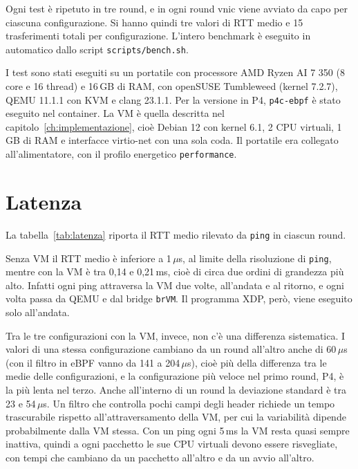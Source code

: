Ogni test è ripetuto in tre round, e in ogni round vnic viene avviato da capo per ciascuna configurazione. Si hanno quindi tre valori di RTT medio e 15 trasferimenti totali per configurazione. L'intero benchmark è eseguito in automatico dallo script \texttt{scripts/bench.sh}.

I test sono stati eseguiti su un portatile con processore AMD Ryzen AI 7 350 (8 core e 16 thread) e 16\,GB di RAM, con openSUSE Tumbleweed (kernel 7.2.7), QEMU 11.1.1 con KVM e clang 23.1.1. Per la versione in P4, \texttt{p4c-ebpf} è stato eseguito nel container.
La VM è quella descritta nel capitolo~\ref{ch:implementazione}, cioè Debian 12 con kernel 6.1, 2 CPU virtuali, 1\,GB di RAM e interfacce virtio-net con una sola coda. Il portatile era collegato all'alimentatore, con il profilo energetico \texttt{performance}.

\section{Latenza}\label{sec:latenza}

La tabella~\ref{tab:latenza} riporta il RTT medio rilevato da \texttt{ping} in ciascun round.

\begin{table}[H]
    \centering
    
    \caption{RTT medio da \texttt{ns0} a \texttt{ns1} in $\mu$s (1000 ping per round)}
    \label{tab:latenza}
\end{table}

Senza VM il RTT medio è inferiore a 1\,$\mu$s, al limite della risoluzione di \texttt{ping}, mentre con la VM è tra 0,14 e 0,21\,ms, cioè di circa due ordini di grandezza più alto. Infatti ogni ping attraversa la VM due volte, all'andata e al ritorno, e ogni volta passa da QEMU e dal bridge \texttt{brVM}. Il programma XDP, però, viene eseguito solo all'andata.

Tra le tre configurazioni con la VM, invece, non c'è una differenza sistematica. I valori di una stessa configurazione cambiano da un round all'altro anche di 60\,$\mu$s (con il filtro in eBPF vanno da 141 a 204\,$\mu$s), cioè più della differenza tra le medie delle configurazioni, e la configurazione più veloce nel primo round, P4, è la più lenta nel terzo. Anche all'interno di un round la deviazione standard è tra 23 e 54\,$\mu$s. Un filtro che controlla pochi campi degli header richiede un tempo trascurabile rispetto all'attraversamento della VM, per cui la variabilità dipende probabilmente dalla VM stessa. Con un ping ogni 5\,ms la VM resta quasi sempre inattiva, quindi a ogni pacchetto le sue CPU virtuali devono essere risvegliate, con tempi che cambiano da un pacchetto all'altro e da un avvio all'altro.

